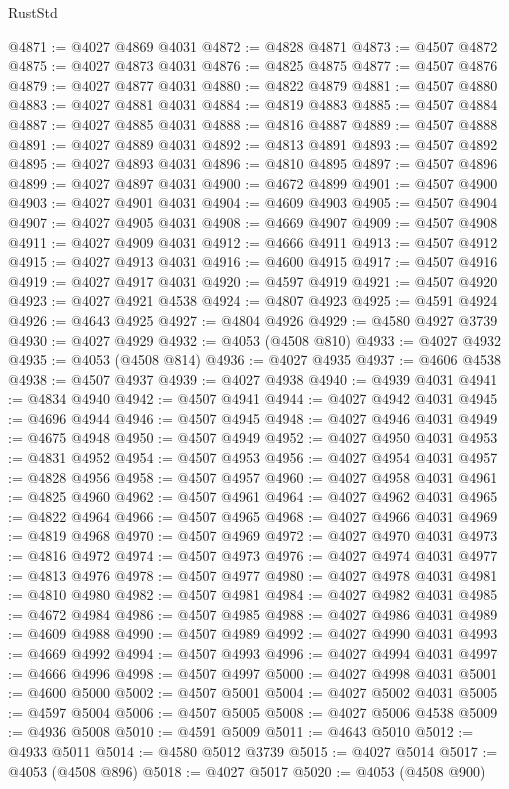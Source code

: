 \begin{lexlean}{RustStd}
\begin{coremodule}
@4871 := @4027 @4869 @4031
@4872 := @4828 @4871
@4873 := @4507 @4872
@4875 := @4027 @4873 @4031
@4876 := @4825 @4875
@4877 := @4507 @4876
@4879 := @4027 @4877 @4031
@4880 := @4822 @4879
@4881 := @4507 @4880
@4883 := @4027 @4881 @4031
@4884 := @4819 @4883
@4885 := @4507 @4884
@4887 := @4027 @4885 @4031
@4888 := @4816 @4887
@4889 := @4507 @4888
@4891 := @4027 @4889 @4031
@4892 := @4813 @4891
@4893 := @4507 @4892
@4895 := @4027 @4893 @4031
@4896 := @4810 @4895
@4897 := @4507 @4896
@4899 := @4027 @4897 @4031
@4900 := @4672 @4899
@4901 := @4507 @4900
@4903 := @4027 @4901 @4031
@4904 := @4609 @4903
@4905 := @4507 @4904
@4907 := @4027 @4905 @4031
@4908 := @4669 @4907
@4909 := @4507 @4908
@4911 := @4027 @4909 @4031
@4912 := @4666 @4911
@4913 := @4507 @4912
@4915 := @4027 @4913 @4031
@4916 := @4600 @4915
@4917 := @4507 @4916
@4919 := @4027 @4917 @4031
@4920 := @4597 @4919
@4921 := @4507 @4920
@4923 := @4027 @4921 @4538
@4924 := @4807 @4923
@4925 := @4591 @4924
@4926 := @4643 @4925
@4927 := @4804 @4926
@4929 := @4580 @4927 @3739
@4930 := @4027 @4929
@4932 := @4053 (@4508 @810)
@4933 := @4027 @4932
@4935 := @4053 (@4508 @814)
@4936 := @4027 @4935
@4937 := @4606 @4538
@4938 := @4507 @4937
@4939 := @4027 @4938
@4940 := @4939 @4031
@4941 := @4834 @4940
@4942 := @4507 @4941
@4944 := @4027 @4942 @4031
@4945 := @4696 @4944
@4946 := @4507 @4945
@4948 := @4027 @4946 @4031
@4949 := @4675 @4948
@4950 := @4507 @4949
@4952 := @4027 @4950 @4031
@4953 := @4831 @4952
@4954 := @4507 @4953
@4956 := @4027 @4954 @4031
@4957 := @4828 @4956
@4958 := @4507 @4957
@4960 := @4027 @4958 @4031
@4961 := @4825 @4960
@4962 := @4507 @4961
@4964 := @4027 @4962 @4031
@4965 := @4822 @4964
@4966 := @4507 @4965
@4968 := @4027 @4966 @4031
@4969 := @4819 @4968
@4970 := @4507 @4969
@4972 := @4027 @4970 @4031
@4973 := @4816 @4972
@4974 := @4507 @4973
@4976 := @4027 @4974 @4031
@4977 := @4813 @4976
@4978 := @4507 @4977
@4980 := @4027 @4978 @4031
@4981 := @4810 @4980
@4982 := @4507 @4981
@4984 := @4027 @4982 @4031
@4985 := @4672 @4984
@4986 := @4507 @4985
@4988 := @4027 @4986 @4031
@4989 := @4609 @4988
@4990 := @4507 @4989
@4992 := @4027 @4990 @4031
@4993 := @4669 @4992
@4994 := @4507 @4993
@4996 := @4027 @4994 @4031
@4997 := @4666 @4996
@4998 := @4507 @4997
@5000 := @4027 @4998 @4031
@5001 := @4600 @5000
@5002 := @4507 @5001
@5004 := @4027 @5002 @4031
@5005 := @4597 @5004
@5006 := @4507 @5005
@5008 := @4027 @5006 @4538
@5009 := @4936 @5008
@5010 := @4591 @5009
@5011 := @4643 @5010
@5012 := @4933 @5011
@5014 := @4580 @5012 @3739
@5015 := @4027 @5014
@5017 := @4053 (@4508 @896)
@5018 := @4027 @5017
@5020 := @4053 (@4508 @900)

\end{coremodule}
\end{lexlean}
